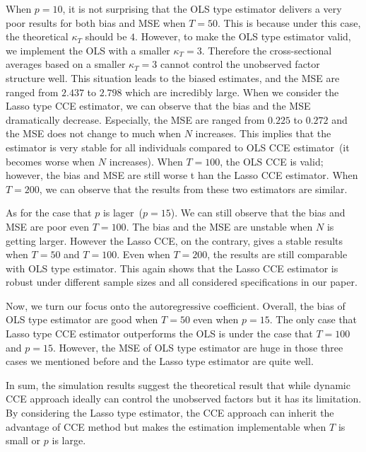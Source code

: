 \documentclass[11pt,a4paper]{article}
\theoremstyle{definition}
\begin{document}
When $p=10$, it is not surprising that the OLS type estimator delivers a very poor results for both bias and MSE when $T=50$. This is because under this case, the theoretical $\kappa_T$ should be $4$. However, to make the OLS type estimator valid, we implement the OLS with a smaller $\kappa_T=3$. Therefore the cross-sectional averages based on a smaller $\kappa_T=3$ cannot control the unobserved factor structure well. This situation leads to the biased estimates, and the MSE are ranged from $2.437$ to $2.798$ which are incredibly large. 
When we consider the Lasso type CCE estimator, we can observe that the bias and the MSE dramatically decrease. Especially, the MSE are ranged from $0.225$ to $0.272$ and the MSE does not change to much when $N$ increases. This implies that the estimator is very stable for all individuals compared to OLS CCE estimator~(it becomes worse when $N$ increases). When $T=100$, the OLS CCE is valid; however, the bias and MSE are still worse t
han the Lasso CCE estimator. When $T=200$, we can observe that the results from these two estimators are similar. 

As for the case that $p$ is lager~($p=15$). We can still observe that the bias and MSE are poor even $T=100$. The bias and the MSE are unstable when $N$ is getting larger. However the Lasso CCE, on the contrary, gives a stable results when $T=50$ and $T=100$. Even when $T=200$, the results are still comparable with OLS type estimator. This again shows that the Lasso CCE estimator is robust under different sample sizes
 and all considered specifications in our paper.
 
Now, we turn our focus onto the autoregressive coefficient. Overall, the bias of OLS type estimator are good when $T=50$ even when $p=15$. The only case that Lasso type CCE estimator outperforms the OLS is under the case that $T=100$ and $p=15$. However, the MSE of OLS type estimator are huge in those three cases we mentioned before and the Lasso type estimator are quite well. 

In sum, the simulation results suggest the theoretical result that while dynamic CCE approach ideally can control the unobserved factors but it has its limitation. By considering the Lasso type estimator, the CCE approach can inherit the advantage of CCE method but makes the estimation implementable when $T$ is small or $p$ is large.
\end{document}
